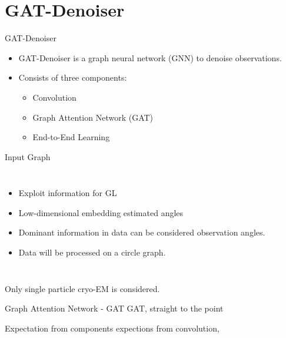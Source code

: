 
\section{GAT-Denoiser}

\begin{frame}{GAT-Denoiser}
  \begin{itemize}
    \item GAT-Denoiser is a graph neural network (GNN) to denoise observations.
    \item Consists of three components:
    \begin{itemize}
      \item Convolution
      \item Graph Attention Network (GAT) \cite{GAT}
      \item End-to-End Learning
    \end{itemize}
  \end{itemize}




\end{frame}

\begin{frame}{Input Graph}
  \begin{columns}
    \begin{itemize}
      \item Exploit information for GL
      \item Low-dimensional embedding estimated angles
      \item Dominant information in data can be considered observation angles.
      \item Data will be processed on a circle graph.
    \end{itemize}
    
  \end{columns}
  

  \begin{tcolorbox}[colback=red!5!white,hide=<-1>, alert=<2>, colframe=red!75!black]
    Only single particle cryo-EM is considered.
\end{tcolorbox}


\end{frame}

\begin{frame}{Graph Attention Network - GAT}
  GAT, straight to the point
\end{frame}

\begin{frame}{Expectation from components}
  expections from convolution,   
\end{frame}

